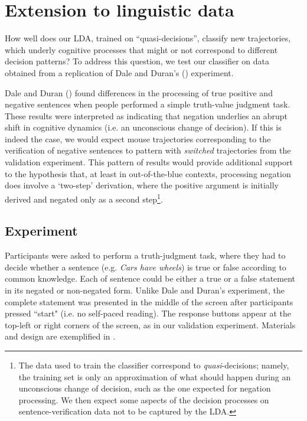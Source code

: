 \documentclass{article}
\begin{document}
\section{Extension to linguistic data}
\label{section:replication}
How well does our LDA, trained on “quasi-decisions”, classify new trajectories, which underly cognitive processes that might or not correspond to different decision patterns? To address this question, we test our classifier on data obtained from a replication of Dale and Duran's (\citeyear{Dale2011})  experiment.   
 
Dale and Duran (\citeyear{Dale2011}) found differences in the processing of true positive and negative sentences when people performed a simple truth-value judgment task. These results were interpreted as indicating that negation underlies an abrupt shift in cognitive dynamics (i.e. an unconscious change of decision). If this is indeed the case, we would expect mouse trajectories corresponding to the verification of negative sentences to pattern with \emph{switched} trajectories from the validation experiment. This pattern of results would provide additional support to the hypothesis that, at least in out-of-the-blue contexts, processing negation does involve a `two-step' derivation, where the positive argument is initially derived and negated only as a second step\footnote{The data used to train the classifier correspond to \emph{quasi}-decisions; namely, the training set is only an approximation of what should happen during an unconscious change of decision, such as the one expected for negation processing. We then expect some aspects of the decision processes on sentence-verification data not to be captured by the LDA.}. 



\subsection{Experiment}
Participants were asked to perform a truth-judgment task, where they had to decide whether a sentence (e.g. \textit{Cars have wheels}) is true or false according to common knowledge. Each of sentence could be either a true or a false statement in its negated or non-negated form. 
Unlike Dale and Duran's experiment, the complete statement was presented in the middle of the screen after participants pressed ``start" (i.e. no self-paced reading). The response buttons appear at the top-left or right corners of the screen, as in our validation experiment.  
Materials and design are exemplified in . 
\end{document}
